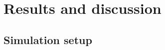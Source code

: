 \documentclass[a4paper,10pt]{report}
\begin{document}
\chapter{\textbf{Results and discussion}}
\section{\textbf{Simulation setup}}
\end{document}
